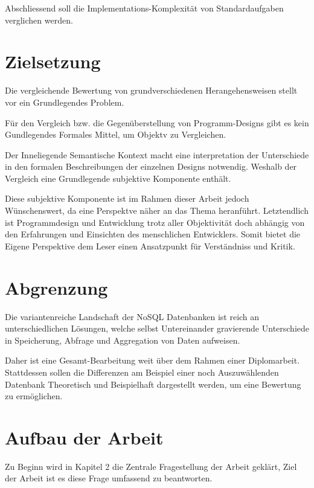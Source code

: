 Abschliessend soll die Implementations-Komplexität von Standardaufgaben verglichen werden.


\section{Zielsetzung}

Die vergleichende Bewertung von grundverschiedenen Herangehensweisen stellt vor ein Grundlegendes Problem.

F\"ur den Vergleich bzw. die Gegen\"uberstellung von Programm-Designs gibt es kein Gundlegendes Formales Mittel,
um Objektv zu Vergleichen.

Der Inneliegende Semantische Kontext macht eine interpretation der Unterschiede
in den formalen Beschreibungen der einzelnen Designs notwendig.
Weshalb der Vergleich eine Grundlegende subjektive Komponente enth\"alt.

Diese subjektive Komponente ist im Rahmen dieser Arbeit jedoch W\"unschenswert,
da eine Perspektve n\"aher an das Thema heranf\"uhrt.
Letztendlich ist Programmdesign und Entwicklung trotz aller Objektivit\"at
doch abh\"angig von den Erfahrungen und Einsichten des menschlichen Entwicklers.
Somit bietet die Eigene Perspektive dem Leser einen Ansatzpunkt f\"ur Verst\"andniss und Kritik.





\section{Abgrenzung}


Die variantenreiche Landschaft der NoSQL Datenbanken ist reich an unterschiedlichen Lösungen,
welche selbst Untereinander gravierende Unterschiede in Speicherung, Abfrage und Aggregation von Daten aufweisen.

Daher ist eine Gesamt-Bearbeitung weit \"uber dem Rahmen einer Diplomarbeit.
Stattdessen sollen die Differenzen am Beispiel einer noch Auszuw\"ahlenden Datenbank
Theoretisch und Beispielhaft dargestellt werden, um eine Bewertung zu erm\"oglichen.


\section{Aufbau der Arbeit}


Zu Beginn wird in Kapitel 2 die Zentrale Fragestellung der Arbeit geklärt,
Ziel der Arbeit ist es diese Frage umfassend zu beantworten.

